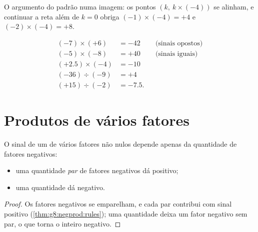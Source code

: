\begin{omfigure}

{\small O argumento do padrão numa imagem: os pontos
$(k,\ k \times (-4))$ se alinham, e continuar a reta além de $k = 0$
obriga $(-1)\times(-4) = +4$ e $(-2)\times(-4) = +8$.}
\end{omfigure}

\begin{example}\label{ex:g8:negprod:products}
\begin{align*}
(-7) \times (+6) &= -42 && \text{(sinais opostos)} \\
(-5) \times (-8) &= +40 && \text{(sinais iguais)} \\
(+2.5) \times (-4) &= -10 \\
(-36) \div (-9) &= +4 \\
(+15) \div (-2) &= -7.5 .
\end{align*}
\end{example}

\section{Produtos de vários fatores}

\begin{proposition}\label{prop:g8:negprod:many}
O sinal de um  de vários fatores não nulos depende apenas da
quantidade de fatores negativos:
\begin{itemize}
  \item uma quantidade \emph{par} de fatores negativos dá 
        positivo;
  \item uma quantidade \emph{} dá  negativo.
\end{itemize}
\end{proposition}

\begin{proof}
Os fatores negativos se emparelham, e cada par contribui com sinal
positivo (\cref{thm:g8:negprod:rules}); uma quantidade  deixa um
fator negativo sem par, o que torna o  inteiro negativo.
\end{proof}

